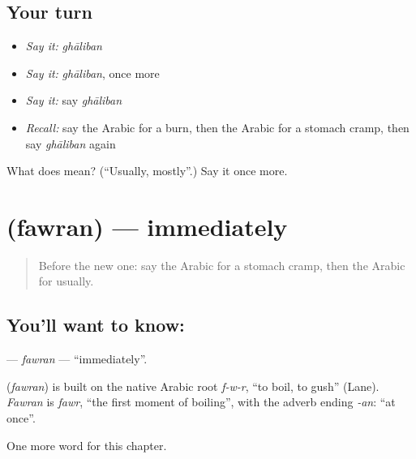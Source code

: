 \subsection*{Your turn}
\begin{itemize}
\raggedright
  \item \emph{Say it:} \emph{ghāliban}
  \item \emph{Say it:} \emph{ghāliban}, once more
  \item \emph{Say it:} say \emph{ghāliban}
  \item \emph{Recall:} say the Arabic for a burn, then the Arabic for a stomach cramp, then say \emph{ghāliban} again
\end{itemize}

\begin{tcolorbox}[breakable,colback=teal!4,colframe=teal!35!black,title={Before you move on}]
What does  mean? (\textquotedblleft{}Usually, mostly\textquotedblright{}.) Say it once more.
\end{tcolorbox}
\section[\texorpdfstring{\ar{فورا} (fawran)}{فورا (fawran)}]{ (fawran) — immediately}

\label{lesson:AR-C202-fawran}



\begin{quote}
Before the new one: say the Arabic for a stomach cramp, then the Arabic for usually.
\end{quote}

\subsection*{You'll want to know: }
\textbf{} — \emph{fawran} — \textquotedblleft{}immediately\textquotedblright{}.

\begin{cousinweb}
\textbf{} (\emph{fawran}) is built on the native Arabic root \emph{f-w-r}, \textquotedblleft{}to boil, to gush\textquotedblright{} (Lane). \emph{Fawran} is \emph{fawr}, \textquotedblleft{}the first moment of boiling\textquotedblright{}, with the adverb ending \emph{-an}: \textquotedblleft{}at once\textquotedblright{}.
\end{cousinweb}

\begin{grammarlens}[title={What you've built}]
One more word for this chapter.
\end{grammarlens}

